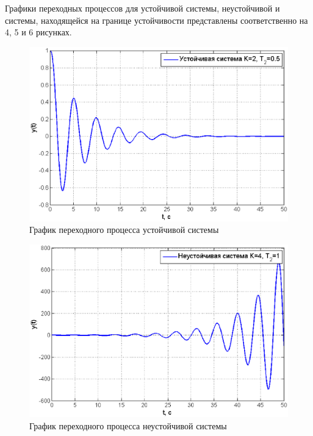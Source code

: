 \documentclass[12pt,a4paper]{article}
\begin{document}
Графики переходных процессов для устойчивой системы, неустойчивой и системы, находящейся на границе устойчивости представлены соответственно на 4, 5 и 6 рисунках.
\begin{figure}[H]
	\centering
	\includegraphics[width=1\linewidth]{ust.eps}
	\caption{График переходного процесса устойчивой системы}
\end{figure}
\begin{figure}[H]
	\centering
	\includegraphics[width=1\linewidth]{neust.eps}
	\caption{График переходного процесса неустойчивой системы}
\end{figure}
\end{document}
